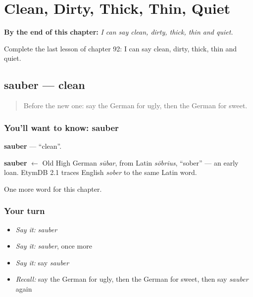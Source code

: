 
\chapter{Clean, Dirty, Thick, Thin, Quiet}
\label{ch:ge-clean-dirty-thick-thin-quiet}

\begin{chapteropening}
\textbf{By the end of this chapter:} \emph{I can say clean, dirty, thick, thin and quiet.}

Complete the last lesson of chapter 92: I can say clean, dirty, thick, thin and quiet.
\end{chapteropening}

\section[sauber]{sauber — clean}

\label{lesson:GE-C92-sauber}



\begin{quote}
Before the new one: say the German for ugly, then the German for sweet.
\end{quote}

\subsection*{You'll want to know: sauber}
\textbf{sauber} — \textquotedblleft{}clean\textquotedblright{}.

\begin{cousinweb}
\textbf{sauber} $\leftarrow$ Old High German \emph{sūbar}, from Latin \emph{sōbrius}, \textquotedblleft{}sober\textquotedblright{} — an early loan. EtymDB 2.1 traces English \emph{sober} to the same Latin word.
\end{cousinweb}

\begin{grammarlens}[title={What you've built}]
One more word for this chapter.
\end{grammarlens}

\subsection*{Your turn}
\begin{itemize}
\raggedright
  \item \emph{Say it:} \emph{sauber}
  \item \emph{Say it:} \emph{sauber}, once more
  \item \emph{Say it:} say \emph{sauber}
  \item \emph{Recall:} say the German for ugly, then the German for sweet, then say \emph{sauber} again
\end{itemize}


